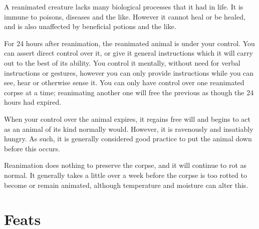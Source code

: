 A reanimated creature lacks many biological processes that it had in life.
It is immune to poisons, diseases and the like.
However it cannot heal or be healed, and is also unaffected by beneficial potions and the like.

For 24 hours after reanimation, the reanimated animal is under your control.
You can assert direct control over it, or give it general instructions which it will carry out to the best of its ability.
You control it mentally, without need for verbal instructions or gestures, however you can only provide instructions while you can see, hear or otherwise sense it.
You can only have control over one reanimated corpse at a time; reanimating another one will free the previous as though the 24 hours had expired.

When your control over the animal expires, it regains free will and begins to act as an animal of its kind normally would.
However, it is ravenously and insatiably hungry.
As such, it is generally considered good practice to put the animal down before this occurs.

Reanimation does nothing to preserve the corpse, and it will continue to rot as normal.
It generally takes a little over a week before the corpse is too rotted to become or remain animated, although temperature and moisture can alter this.

\section{Feats}


